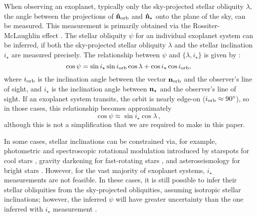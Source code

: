 \documentclass[twocolumn,times]{aastex631}
\begin{document}
When observing an exoplanet, typically only the sky-projected stellar obliquity $\lambda$, the angle between the projections of $\vb{\hat{n}_{\rm orb}}$ and $\vb{\hat{n}_\star}$ onto the plane of the sky, can be measured. This measurement is primarily obtained via the Rossiter-McLaughlin effect \citep{Rossiter24, McLaughlin24}. The stellar obliquity $\psi$ for an individual exoplanet system can be inferred, if both the sky-projected stellar obliquity $\lambda$ and the stellar inclination $i_\star$ are measured precisely. The relationship between $\psi$ and $\{\lambda, i_\star\}$ is given by \citep[e.g.,][]{Fabrycky09}:
\begin{equation}\label{eqn:psi}
    \cos{\psi} = \sin{i_\star}\sin{i_{\rm orb}}\cos{\lambda} + \cos{i_\star}\cos{i_{\rm orb}},
\end{equation}
where $i_{\rm orb}$ is the inclination angle between the vector $\bf{n}_{\rm orb}$ and the observer's line of sight, and $i_\star$ is the inclination angle between $\bf{n}_{\star}$ and the observer's line of sight.
If an exoplanet system transits, the orbit is nearly edge-on ($i_{\rm orb} \approx 90\mbox{$^\circ$}$), so in those cases, this relationship becomes approximately
\begin{equation}
\cos{\psi} \approx \sin{i_\star}\cos{\lambda}\,,
\end{equation}
although this is not a simplification that we are required to make in this paper.

In some cases, stellar inclinations can be constrained via, for example, photometric and spectroscopic rotational modulation introduced by starspots for cool stars \citep[e.g.,][]{Masuda20, Albrecht21}, gravity darkening for fast-rotating stars \citep[e.g.,][]{Barnes09, Barnes11}, and asteroseismology for bright stars \citep[e.g.][]{Chaplin13}.
However, for the vast majority of exoplanet systems, $i_\star$ measurements are not feasible. In these cases, it is still possible to infer their stellar obliquities from the sky-projected obliquities, assuming isotropic stellar inclinations; however, the inferred $\psi$ will have greater uncertainty than the one inferred with $i_\star$ measurement \citep{Fabrycky09}.
\end{document}
